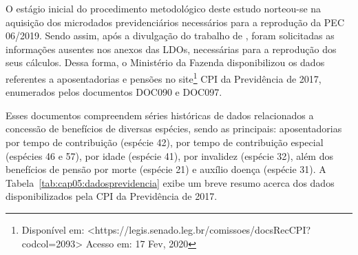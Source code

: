 O estágio inicial do procedimento metodológico deste estudo norteou-se na aquisição dos microdados previdenciários necessários para a reprodução da PEC 06/2019. Sendo assim, após a divulgação do trabalho de \cite{cap05_ref9}, foram solicitadas as informações ausentes nos anexos das LDOs, necessárias para a reprodução dos seus cálculos. Dessa forma, o Ministério da Fazenda disponibilizou os dados referentes a aposentadorias e pensões no site\footnote{Disponível em: <https://legis.senado.leg.br/comissoes/docsRecCPI?codcol=2093> Acesso em: 17 Fev, 2020} CPI da Previdência de 2017, enumerados pelos documentos DOC090 e DOC097.

Esses documentos compreendem séries históricas de dados relacionados a concessão de benefícios de diversas espécies, sendo as principais: aposentadorias por tempo de contribuição (espécie 42), por tempo de contribuição especial (espécies 46 e 57), por idade (espécie 41), por invalidez (espécie 32), além dos benefícios de pensão por morte (espécie 21) e auxílio doença (espécie 31). A Tabela~\ref{tab:cap05:dadosprevidencia} exibe um breve resumo acerca dos dados disponibilizados pela CPI da Previdência de 2017.


